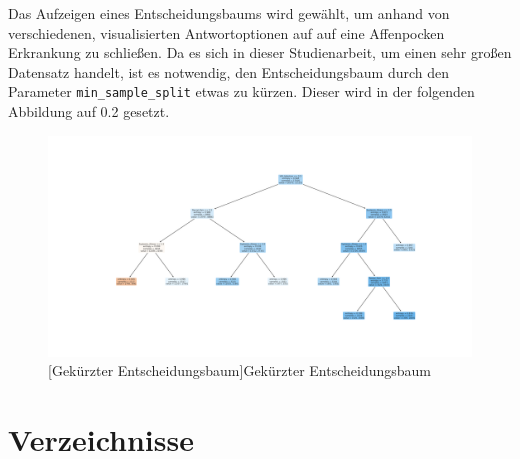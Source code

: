 \documentclass[13pt,a4paper, listof=entryprefix, bibliography=totocnumbered,toc=listofnumbered,lof=listofnumbered]{scrartcl}
\newcounter{verzeichnis}
\begin{document}
	Das Aufzeigen eines Entscheidungsbaums wird gewählt, um anhand von verschiedenen, visualisierten Antwortoptionen auf auf eine Affenpocken Erkrankung zu schließen.
	Da es sich in dieser Studienarbeit, um einen sehr großen Datensatz handelt, ist es notwendig, den Entscheidungsbaum durch den Parameter \lstinline{min_sample_split} etwas zu kürzen. Dieser wird in der folgenden Abbildung auf 
	0.2 gesetzt. 

	\begin{figure}[H]
		\centering
		\includegraphics[width=0.8\linewidth]{Bilder/decision_tree.png}
		[Gekürzter Entscheidungsbaum]{Gekürzter Entscheidungsbaum}
		\label{fig:decisiontree}
	\end{figure}

		\pagebreak

		 \label{Verzeichnisse}
		\renewcommand{\thesection}{\Roman{verzeichnis}}
		\section*{Verzeichnisse} 
   		 \label{Literaturverzeichnis}
		\renewcommand{\refname}{Literaturverzeichnis}
		\printbibliography
		\pagebreak

		\listoffigures
		\pagebreak


		\listoftables
		\pagebreak

        \lstlistoflistings
        \pagebreak
\end{document}
